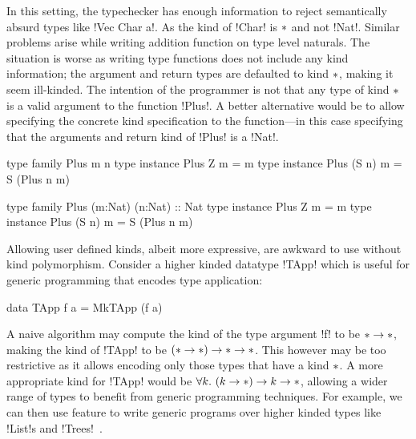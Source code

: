 \documentclass[screen,nonacm,manuscript,review]{acmart} %
\begin{document}
In this setting, the typechecker has enough information to reject
semantically absurd types like !Vec Char a!. As the kind of !Char! is
$\ast$ and not !Nat!. Similar problems arise while writing addition function on type level
naturals. The situation is worse as writing type functions does not
include any kind information; the argument and return types are
defaulted to kind $\ast$, making it seem ill-kinded. The intention of
the programmer is not that any type of kind $\ast$ is a valid
argument to the function !Plus!. A better alternative would be to
allow specifying the concrete kind specification to the function---in
this case specifying that the arguments and return kind of !Plus! is a
!Nat!.


\begin{minipage}[ht]{0.4\linewidth}
\begin{code}
     type family Plus m n
     type instance Plus Z m = m
     type instance Plus (S n) m = S (Plus n m)
\end{code}
\end{minipage}
\begin{minipage}[ht]{0.4\linewidth}
\begin{code}
     type family Plus (m:Nat) (n:Nat) :: Nat
     type instance Plus Z m = m
     type instance Plus (S n) m = S (Plus n m)
\end{code}
\end{minipage}

Allowing user defined kinds, albeit more expressive, are awkward to use without kind polymorphism. Consider a higher kinded datatype !TApp! which is useful for generic programming that encodes type application:

\begin{CenteredBox}
\begin{code}
data TApp f a = MkTApp (f a)
\end{code}
\end{CenteredBox}

A naive algorithm may compute the kind of the type argument !f! to be $\ast \to \ast$, making the kind of !TApp! to be $(\ast \to \ast) \to \ast \to \ast$. This however may be too restrictive as it allows encoding only those types that have a kind $\ast$. A more appropriate kind for !TApp! would be $\forall k.~(k\to\ast) \to k \to \ast$, allowing a wider range of types to benefit from generic programming techniques. For example, we can then use feature to write generic programs over higher kinded types like !List!s and !Trees!~\cite{magalhaes_generic_2010}.
\end{document}
